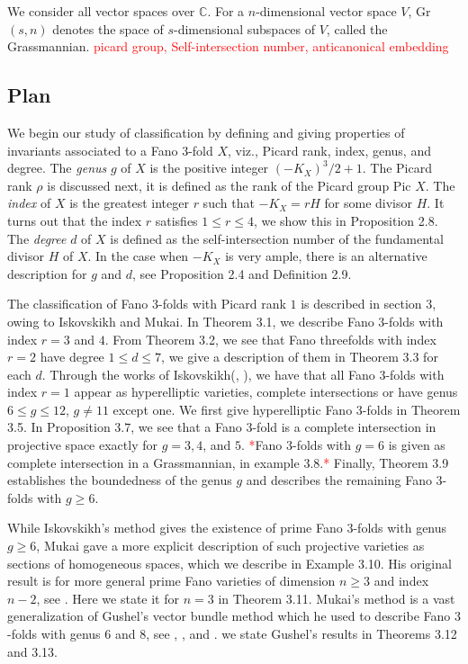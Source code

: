 \documentclass[11pt]{amsart}
\theoremstyle{plain}
\theoremstyle{definition}
\theoremstyle{expl}
\begin{document}
We consider all vector spaces over $\mathbb{C}$. For a $n$-dimensional vector space $V$, Gr$(s,n)$ denotes the space of $s$-dimensional subspaces of $V$, called the Grassmannian. \textcolor{red}{picard group, Self-intersection number, anticanonical embedding}

\subsection{Plan} We begin our study of classification by defining and giving properties of invariants associated to a Fano $3$-fold $X$, viz., Picard rank, index, genus, and degree. The \textit{genus} $g$ of $X$ is the positive integer $(-K_X)^3/2 +1$. The Picard rank $\rho$ is discussed next, it is defined as the rank of the Picard group Pic $X$. The \textit{index} of $X$ is the greatest integer $r$ such that $-K_X = rH$ for some divisor $H$. It turns out that the index $r$ satisfies $1 \leq r \leq 4$, we show this in Proposition 2.8. The \textit{degree} $d$ of $X$ is defined as the self-intersection number of the fundamental divisor $H$ of $X$. In the case when $-K_X$ is very ample, there is an alternative description for $g$ and $d$, see Proposition 2.4 and Definition 2.9. 

The classification of Fano $3$-folds with Picard rank $1$ is described in section $3$, owing to Iskovskikh and Mukai. In Theorem 3.1, we describe Fano $3$-folds with index $r=3$ and $4$. From Theorem 3.2, we see that Fano threefolds with index $r=2$ have degree $1\leq d \leq 7$, we give a description of them in Theorem 3.3 for each $d$. Through the works of Iskovskikh(\cite{Isk77}, \cite{Isk78}), we have that all Fano $3$-folds with index $r=1$ appear as hyperelliptic varieties, complete intersections or have genus $6 \leq g \leq 12$, $g\neq 11$ except one. We first give hyperelliptic Fano $3$-folds in Theorem 3.5. In Proposition $3.7$, we see that a Fano $3$-fold is a complete intersection in projective space exactly for $g=3,4$, and $5$. \textcolor{red}{*}Fano $3$-folds with $g=6$ is given as complete intersection in a Grassmannian, in example 3.8.\textcolor{red}{*} Finally, Theorem 3.9 establishes the boundedness of the genus $g$ and describes the remaining Fano $3$-folds with $g\geq 6$. 

While Iskovskikh's method gives the existence of prime Fano $3$-folds with genus $g \geq 6$, Mukai gave a more explicit description of such projective varieties as sections of homogeneous spaces, which we describe in Example 3.10. His original result is for more general prime Fano varieties of dimension $n\geq 3$ and index $n-2$, see \cite{Muk89}. Here we state it for $n=3$ in Theorem 3.11. Mukai's method is a vast generalization of Gushel's vector bundle method which he used to describe Fano $3$-folds with genus $6$ and $8$, see \cite{Gus6}, \cite{Gus83}, and \cite{Gus92}. we state Gushel's results in Theorems 3.12 and 3.13.
\end{document}
